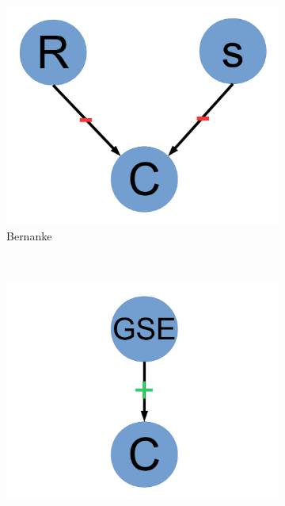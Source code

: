 \documentclass[11pt]{article}
\begin{document}
\begin{figure}
        \centering
        \begin{subfigure}[b]{0.2\textwidth}
                \includegraphics[width=\textwidth]{bernanke.pdf}
                \caption{\footnotesize Bernanke}
                \label{fig:bernanke}
        \end{subfigure}%
        ~ %
        \begin{subfigure}[b]{0.2\textwidth}
                \includegraphics[width=\textwidth]{paulson.pdf}

\end{subfigure}
\end{figure}
\end{document}

